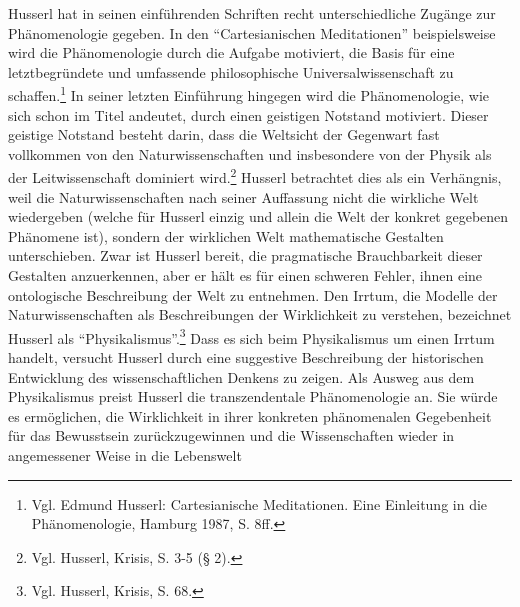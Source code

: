 Husserl hat in seinen einführenden Schriften recht unterschiedliche Zugänge
zur Phänomenologie gegeben. In den "`Cartesianischen Meditationen"'
beispielsweise wird die Phänomenologie durch die Aufgabe motiviert, die Basis
für eine letztbegründete und umfassende philosophische Universalwissenschaft
zu schaffen.\footnote{Vgl. Edmund Husserl: Cartesianische Meditationen. Eine
  Einleitung in die Phänomenologie, Hamburg 1987, S. 8ff.} In seiner letzten
Einführung hingegen wird die Phänomenologie, wie sich schon im Titel andeutet,
durch einen geistigen Notstand motiviert. Dieser geistige Notstand besteht
darin, dass die Weltsicht der Gegenwart fast vollkommen von den
Naturwissenschaften und insbesondere von der Physik als der Leitwissenschaft
dominiert wird.\footnote{Vgl. Husserl, Krisis, S. 3-5 (§ 2).} Husserl
betrachtet dies als ein Verhängnis, weil die Naturwissenschaften nach seiner
Auf\/fassung nicht die wirkliche Welt wiedergeben (welche für Husserl einzig
und allein die Welt der konkret gegebenen Phänomene ist), sondern der
wirklichen Welt mathematische Gestalten unterschieben. Zwar ist Husserl
bereit, die pragmatische Brauchbarkeit dieser Gestalten anzuerkennen, aber er
hält es für einen schweren Fehler, ihnen eine ontologische Beschreibung der
Welt zu entnehmen. Den Irrtum, die Modelle der Naturwissenschaften als
Beschreibungen der Wirklichkeit zu verstehen, bezeichnet Husserl als
"`Physikalismus"'.\footnote{Vgl. Husserl, Krisis, S. 68.} Dass es sich beim
Physikalismus um einen Irrtum handelt, versucht Husserl durch eine suggestive
Beschreibung der historischen Entwicklung des wissenschaftlichen Denkens zu
zeigen. Als Ausweg aus dem Physikalismus preist Husserl die transzendentale
Phänomenologie an. Sie würde es ermöglichen, die Wirklichkeit in ihrer
konkreten phänomenalen Gegebenheit für das Bewusstsein zurückzugewinnen und
die Wissenschaften wieder in angemessener Weise in die Lebenswelt
